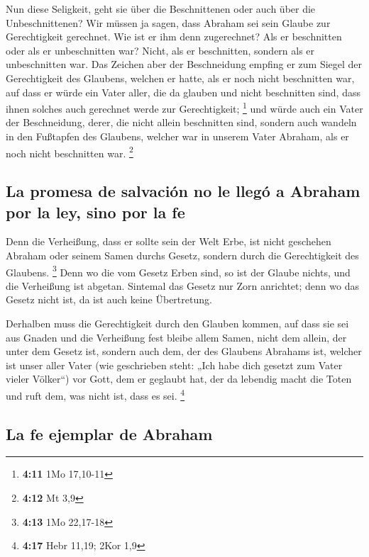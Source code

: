  Nun diese Seligkeit, geht sie über die Beschnittenen oder
auch über die Unbeschnittenen? Wir müssen ja sagen, dass Abraham sei
sein Glaube zur Gerechtigkeit gerechnet.  Wie ist er ihm
denn zugerechnet? Als er beschnitten oder als er unbeschnitten war?
Nicht, als er beschnitten, sondern als er unbeschnitten war.
 Das Zeichen aber der Beschneidung empfing er zum Siegel
der Gerechtigkeit des Glaubens, welchen er hatte, als er noch nicht
beschnitten war, auf dass er würde ein Vater aller, die da glauben und
nicht beschnitten sind, dass ihnen solches auch gerechnet werde zur
Gerechtigkeit; \footnote{\textbf{4:11} 1Mo 17,10-11}  und
würde auch ein Vater der Beschneidung, derer, die nicht allein
beschnitten sind, sondern auch wandeln in den Fußtapfen des Glaubens,
welcher war in unserem Vater Abraham, als er noch nicht beschnitten war.
\footnote{\textbf{4:12} Mt 3,9}

\hypertarget{la-promesa-de-salvaciuxf3n-no-le-lleguxf3-a-abraham-por-la-ley-sino-por-la-fe}{%
\subsection{La promesa de salvación no le llegó a Abraham por la ley,
sino por la
fe}\label{la-promesa-de-salvaciuxf3n-no-le-lleguxf3-a-abraham-por-la-ley-sino-por-la-fe}}

 Denn die Verheißung, dass er sollte sein der Welt Erbe,
ist nicht geschehen Abraham oder seinem Samen durchs Gesetz, sondern
durch die Gerechtigkeit des Glaubens. \footnote{\textbf{4:13} 1Mo
  22,17-18}  Denn wo die vom Gesetz Erben sind, so ist
der Glaube nichts, und die Verheißung ist abgetan. 
Sintemal das Gesetz nur Zorn anrichtet; denn wo das Gesetz nicht ist, da
ist auch keine Übertretung.

 Derhalben muss die Gerechtigkeit durch den Glauben
kommen, auf dass sie sei aus Gnaden und die Verheißung fest bleibe allem
Samen, nicht dem allein, der unter dem Gesetz ist, sondern auch dem, der
des Glaubens Abrahams ist, welcher ist unser aller Vater 
(wie geschrieben steht: „Ich habe dich gesetzt zum Vater vieler
Völker``) vor Gott, dem er geglaubt hat, der da lebendig macht die Toten
und ruft dem, was nicht ist, dass es sei. \footnote{\textbf{4:17} Hebr
  11,19; 2Kor 1,9}

\hypertarget{la-fe-ejemplar-de-abraham}{%
\subsection{La fe ejemplar de Abraham}\label{la-fe-ejemplar-de-abraham}}


